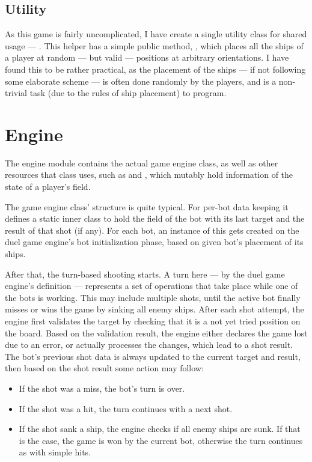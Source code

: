 			\subsection{Utility}
			
			As this game is fairly uncomplicated, I have create a single utility class for shared usage --- . This helper has a simple public method, , which places all the ships of a player at random --- but valid --- positions at arbitrary orientations. I have found this to be rather practical, as the placement of the ships --- if not following some elaborate scheme --- is often done randomly by the players, and is a non-trivial task (due to the rules of ship placement) to program.
		
		\section{Engine}		

		The engine module contains the actual game engine class, as well as other resources that class uses, such as  and , which mutably hold information of the state of a player's field.

		The game engine class' structure is quite typical. For per-bot data keeping it defines a static inner class to hold the field of the bot with its last target and the result of that shot (if any). For each bot, an instance of this gets created on the duel game engine's bot initialization phase, based on given bot's placement of its ships.
		
		After that, the turn-based shooting starts. A turn here --- by the duel game engine's definition --- represents a set of operations that take place while one of the bots is working. This may include multiple shots, until the active bot finally misses or wins the game by sinking all enemy ships. After each shot attempt, the engine first validates the target by checking that it is a not yet tried position on the board. Based on the validation result, the engine either declares the game lost due to an error, or actually processes the changes, which lead to a shot result. The bot's previous shot data is always updated to the current target and result, then based on the shot result some action may follow: 
		
		\begin{itemize}
		
			\item If the shot was a miss, the bot's turn is over.
			
			\item If the shot was a hit, the turn continues with a next shot.
			
			\item If the shot sank a ship, the engine checks if all enemy ships are sunk. If that is the case, the game is won by the current bot, otherwise the turn continues as with simple hits.
		
		\end{itemize}

